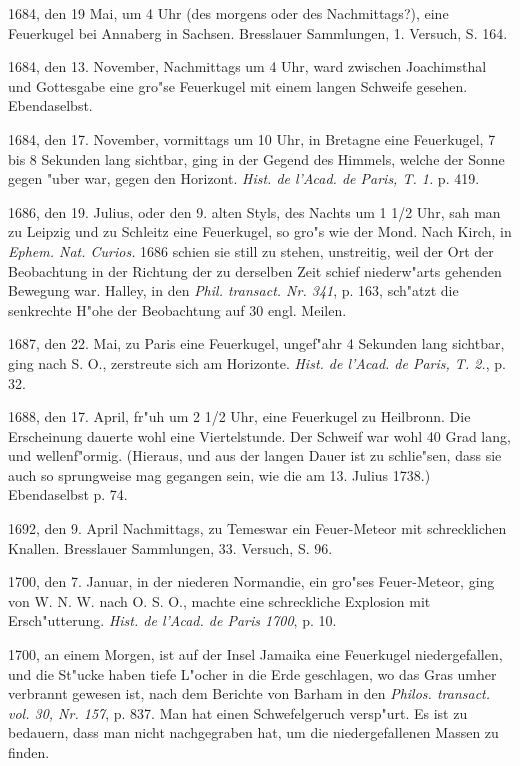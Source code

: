 \documentclass[a4paper, 11pt, oneside, polutonikogreek, german]{article}
\begin{document}
1684, den 19 Mai, um 4 Uhr (des morgens oder des Nachmittags?), eine Feuerkugel bei Annaberg in Sachsen. Bresslauer Sammlungen, 1. Versuch, S. 164.

1684, den 13. November, Nachmittags um 4 Uhr, ward zwischen Joachimsthal und Gottesgabe eine gro"se Feuerkugel mit einem langen Schweife gesehen. Ebendaselbst.

1684, den 17. November, vormittags um 10 Uhr, in Bretagne eine Feuerkugel, 7 bis 8 Sekunden lang sichtbar, ging in der Gegend des Himmels, welche der Sonne gegen "uber war, gegen den Horizont. \emph{Hist. de l'Acad. de Paris, T. 1.} p. 419.

1686, den 19. Julius, oder den 9. alten Styls, des Nachts um 1 1/2 Uhr, sah man zu Leipzig und zu Schleitz eine Feuerkugel, so gro"s wie der Mond. Nach Kirch, in \emph{Ephem. Nat. Curios.} 1686 schien sie still zu stehen, unstreitig, weil der Ort der Beobachtung in der Richtung der zu derselben Zeit schief niederw"arts gehenden Bewegung war. Halley, in den \emph{Phil. transact. Nr. 341}, p. 163, sch"atzt die senkrechte H"ohe der Beobachtung auf 30 engl. Meilen.

1687, den 22. Mai, zu Paris eine Feuerkugel, ungef"ahr 4 Sekunden lang sichtbar, ging nach S. O., zerstreute sich am Horizonte. \emph{Hist. de l'Acad. de Paris, T. 2.}, p. 32.

1688, den 17. April, fr"uh um 2 1/2 Uhr, eine Feuerkugel zu Heilbronn. Die Erscheinung dauerte wohl eine Viertelstunde. Der Schweif war wohl 40 Grad lang, und wellenf"ormig. (Hieraus, und aus der langen Dauer ist zu schlie"sen, dass sie auch so sprungweise mag gegangen sein, wie die am 13. Julius 1738.) Ebendaselbst p. 74.

1692, den 9. April Nachmittags, zu Temeswar ein Feuer-Meteor mit schrecklichen Knallen. Bresslauer Sammlungen, 33. Versuch, S. 96.

1700, den 7. Januar, in der niederen Normandie, ein gro"ses Feuer-Meteor, ging von W. N. W. nach O. S. O., machte eine schreckliche Explosion mit Ersch"utterung. \emph{Hist. de l'Acad. de Paris 1700}, p. 10.

1700, an einem Morgen, ist auf der Insel Jamaika eine Feuerkugel niedergefallen, und die St"ucke haben tiefe L"ocher in die Erde geschlagen, wo das Gras umher verbrannt gewesen ist, nach dem Berichte von Barham in den \emph{Philos. transact. vol. 30, Nr. 157}, p. 837. Man hat einen Schwefelgeruch versp"urt. Es ist zu bedauern, dass man nicht nachgegraben hat, um die niedergefallenen Massen zu finden.
\end{document}
